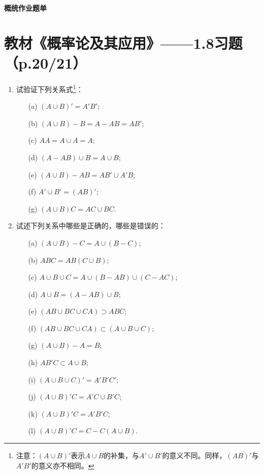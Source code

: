 \documentclass[UTF8]{ctexart}
\begin{document}
\begin{center}
\LARGE\bfseries 概统作业题单
\end{center}

\section*{教材《概率论及其应用》——1.8习题（p.20/21）}

\begin{enumerate}
\renewcommand{\labelenumi}{\textbf{\arabic{enumi}.}}
\setcounter{enumi}{13}
\item 试验证下列关系式\footnote{注意：$(A\cup B)'$表示$A\cup B$的补集，与$A'\cup B'$的意义不同。同样，$(AB)'$与$A'B'$的意义亦不相同。}：
\begin{enumerate}
\item[(a)] $(A\cup B)' = A'B'$;
\item[(b)] $(A\cup B)-B = A-AB = AB'$;
\item[(c)] $AA = A\cup A = A$;
\item[(d)] $(A-AB)\cup B = A\cup B$;
\item[(e)] $(A\cup B)-AB = AB'\cup A'B$;
\item[(f)] $A'\cup B' = (AB)'$;
\item[(g)] $(A\cup B)C = AC\cup BC$.
\end{enumerate}

\setcounter{enumi}{15}
\item 试述下列关系中哪些是正确的，哪些是错误的：
\begin{enumerate}
\item[(a)] $(A\cup B)-C = A\cup(B-C)$;
\item[(b)] $ABC = AB(C\cup B)$;
\item[(c)] $A\cup B\cup C = A\cup(B-AB)\cup(C-AC)$;
\item[(d)] $A\cup B = (A-AB)\cup B$;
\item[(e)] $(AB\cup BC\cup CA) \supset ABC$;
\item[(f)] $(AB\cup BC\cup CA) \subset (A\cup B\cup C)$;
\item[(g)] $(A\cup B)-A = B$;
\item[(h)] $AB'C \subset A\cup B$;
\item[(i)] $(A\cup B\cup C)' = A'B'C'$;
\item[(j)] $(A\cup B)'C = A'C\cup B'C$;
\item[(k)] $(A\cup B)'C = A'B'C$;
\item[(l)] $(A\cup B)'C = C-C(A\cup B)$.
\end{enumerate}


\end{enumerate}
\end{document}
